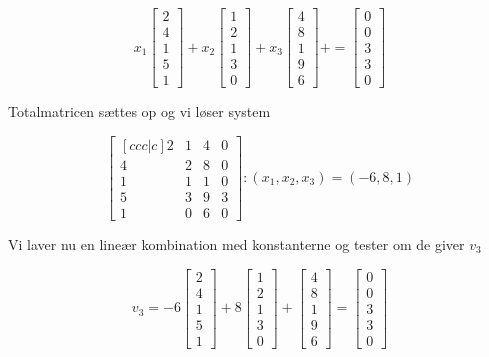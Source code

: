 \documentclass[12pt]{article}
\begin{document}
{\[
x_1\begin{bmatrix}
2 \\ 4 \\ 1\\ 5 \\1
\end{bmatrix} + 
x_2\begin{bmatrix}
1 \\ 2 \\ 1\\ 3 \\0
\end{bmatrix} + 
x_3\begin{bmatrix}
4 \\ 8 \\ 1\\ 9 \\6
\end{bmatrix} + 
 = \begin{bmatrix}
0\\0\\3\\3\\0
\end{bmatrix}
\] 

Totalmatricen sættes op og vi løser system

\[
\begin{bmatrix}[ccc|c]
2 & 1 & 4 & 0 \\
4 & 2 & 8 & 0 \\
1 & 1 & 1 & 0 \\
5 & 3 & 9 & 3 \\
1 & 0 & 6 & 0
\end{bmatrix} : (x_1, x_2, x_3) = (-6 , 8, 1)
\]

Vi laver nu en lineær kombination med konstanterne og tester om de giver $v_3$

\[
v_3 = -6 \begin{bmatrix} 2 \\ 4 \\ 1 \\ 5 \\ 1 \end{bmatrix} +
		  8 \begin{bmatrix} 1 \\ 2 \\ 1 \\ 3 \\ 0 \end{bmatrix} +
		    \begin{bmatrix} 4 \\ 8 \\ 1 \\ 9 \\6 \end{bmatrix} =
		\begin{bmatrix}
		0 \\ 0 \\ 3 \\ 3 \\ 0
		\end{bmatrix}
\]\\

}
\end{document}
